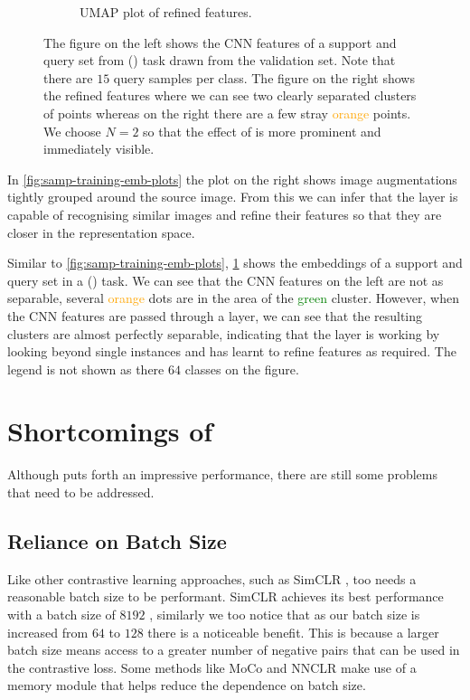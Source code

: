 \begin{figure}[t]
\begin{subfigure}[b]{0.4\textwidth}
         \caption{UMAP plot of \samp{} refined features.}
     \end{subfigure}
     \caption{The figure on the left shows the CNN features of a support and query set from () task drawn from the \miniImagenet{} validation set. Note that there are $15$ query samples per class.
     The figure on the right shows the \samp{} refined features where we can see two clearly separated clusters of points whereas on the right there are a few stray \textcolor{orange}{orange} points. We choose $N=2$ so that the effect of \samp{} is more prominent and immediately visible.}
     \label{fig:samp-val-emb-plots}
\end{figure}
In \cref{fig:samp-training-emb-plots} the plot on the right shows image augmentations tightly grouped around the source image. From this we can infer that the \samp{} layer is capable of recognising similar images and refine their features so that they are closer in the representation space.

Similar to \cref{fig:samp-training-emb-plots}, \cref{fig:samp-val-emb-plots} shows the embeddings of a support and query set in a () task. We can see that the CNN features on the left are not as separable, several \textcolor{orange}{orange} dots are in the area of the \textcolor{green}{green} cluster. However, when the CNN features are passed through a \samp{} layer, we can see that the resulting clusters are almost perfectly separable, indicating that the \samp{} layer is working by looking beyond single instances and has learnt to refine features as required. The legend is not shown as there $64$ classes on the figure.

\section{Shortcomings of \samptr{}}\label{sec:samptr-shortcomings}
Although \samptr{} puts forth an impressive performance, there are still some problems that need to be addressed.

\subsection{Reliance on Batch Size}\label{ssec:reliance-on-bsize}
Like other contrastive learning approaches, such as SimCLR \parencite{chen2020simple}, \samptr{} too needs a reasonable batch size to be performant. 
SimCLR achieves its best performance with a batch size of $8192$ \parencite{chen2020simple}, similarly we too notice that as our batch size is increased from $64$ to $128$ there is a noticeable benefit. This is because a larger batch size means access to a greater number of negative pairs that can be used in the contrastive loss. Some methods like MoCo \parencite{he2020momentum} and NNCLR \parencite{dwibedi2021little} make use of a memory module that helps reduce the dependence on batch size.

